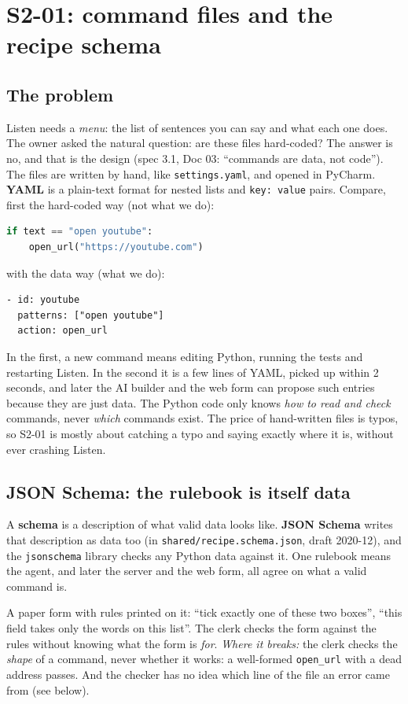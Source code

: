 \documentclass[11pt,a4paper]{article}
\begin{document}
\section{S2-01: command files and the recipe schema}
\subsection{The problem}
Listen needs a \emph{menu}: the list of sentences you can say and what each one does. The owner
asked the natural question: are these files hard-coded? The answer is no, and that is the design
(spec 3.1, Doc 03: ``commands are data, not code''). The files are written by hand, like
\texttt{settings.yaml}, and opened in PyCharm. \textbf{YAML} is a plain-text format for nested
lists and \texttt{key: value} pairs. Compare, first the hard-coded way (not what we do):
\begin{lstlisting}[language=Python]
if text == "open youtube":
    open_url("https://youtube.com")
\end{lstlisting}
\noindent with the data way (what we do):
\begin{lstlisting}
- id: youtube
  patterns: ["open youtube"]
  action: open_url
\end{lstlisting}
\noindent In the first, a new command means editing Python, running the tests and restarting
Listen. In the second it is a few lines of YAML, picked up within 2 seconds, and later the AI
builder and the web form can propose such entries because they are just data.
\noindent The Python code only knows \emph{how to read and check} commands, never \emph{which}
commands exist. The price of hand-written files is typos, so S2-01 is mostly about catching a
typo and saying exactly where it is, without ever crashing Listen.

\subsection{JSON Schema: the rulebook is itself data}
A \textbf{schema} is a description of what valid data looks like. \textbf{JSON Schema} writes that
description as data too (in \texttt{shared/recipe.schema.json}, draft 2020-12), and the
\texttt{jsonschema} library checks any Python data against it. One rulebook means the agent, and
later the server and the web form, all agree on what a valid command is.

\begin{analogy}
A paper form with rules printed on it: ``tick exactly one of these two boxes'', ``this field takes
only the words on this list''. The clerk checks the form against the rules without knowing what
the form is \emph{for}. \emph{Where it breaks:} the clerk checks the \emph{shape} of a command,
never whether it works: a well-formed \texttt{open\_url} with a dead address passes. And the
checker has no idea which line of the file an error came from (see below).
\end{analogy}
\end{document}
